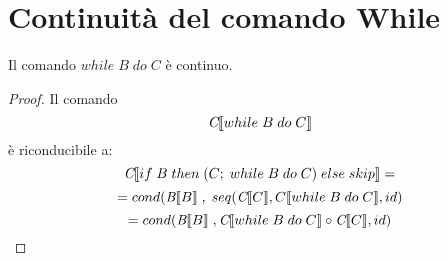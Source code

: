 \section{Continuità del comando While}
Il comando $ while\; B\; do\; C $ è continuo.

\begin{proof}

  Il comando $$\emph{C}\llbracket while\; B\; do\; C \rrbracket $$ è riconducibile a:
  $$ \emph{C}\llbracket if\; B\; then\; (C;\; while\; B\; do\; C)\; else\; skip \rrbracket = $$
  $$ = cond( \emph{B}\llbracket B \rrbracket\; ,\; seq(\emph{C}\llbracket C \rrbracket , C \llbracket \\ while\; B\; do\; C \rrbracket , id ) $$
  $$ = cond( \emph{B}\llbracket B \rrbracket\;, \emph{C}\llbracket while\; B\; do\; C \rrbracket \circ \emph{C}\llbracket C \rrbracket , id) $$


\end{proof}
